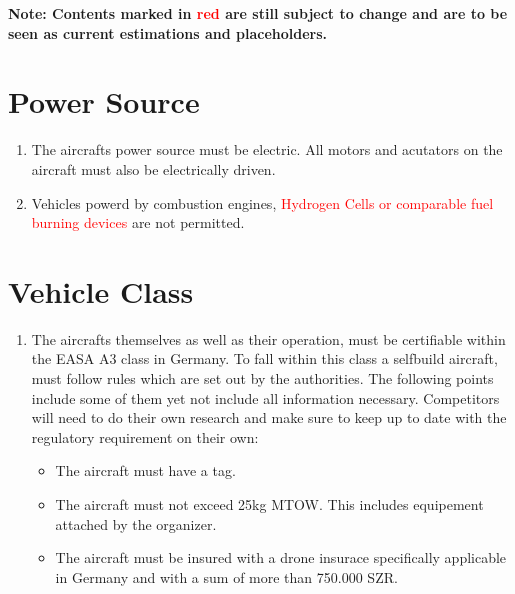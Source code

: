\documentclass{article}
\begin{document}


\tableofcontents{}
\newpage

{\bf Note: Contents marked in \textcolor{red}{red} are still subject to change and are to be seen as current estimations and placeholders.}


\section{Power Source}
\begin{enumerate}
  \item The aircrafts power source must be electric. All motors and acutators on the aircraft must also be electrically driven.
  \item Vehicles powerd by combustion engines, \textcolor{red}{Hydrogen Cells or comparable fuel burning devices} are not permitted. 
\end{enumerate}

\section{Vehicle Class}
\begin{enumerate}
  \item The aircrafts themselves as well as their operation, must be certifiable within the EASA A3 class in Germany. To fall within this class a selfbuild aircraft, must follow rules which are set out by the authorities. 
  The following points include some of them yet not include all information necessary. Competitors will need to do their own research and make sure to keep up to date with the regulatory requirement on their own:
  \begin{itemize}
    \item The aircraft must have a tag.
    \item The aircraft must not exceed 25kg MTOW. This includes equipement attached by the organizer.
    \item The aircraft must be insured with a drone insurace specifically applicable in Germany and with a sum of more than 750.000 SZR. 
  \end{itemize}
\end{enumerate}
\end{document}
